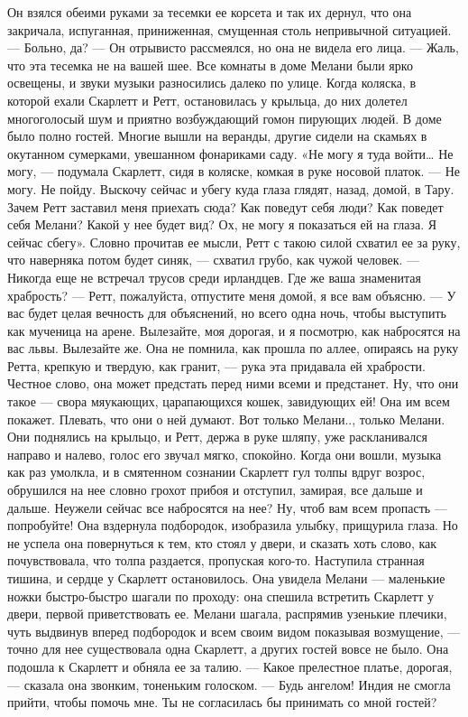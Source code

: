Он взялся обеими руками за тесемки ее корсета и так их дернул, что она закричала, испуганная, приниженная, смущенная столь непривычной ситуацией.
— Больно, да? — Он отрывисто рассмеялся, но она не видела его лица. — Жаль, что эта тесемка не на вашей шее.
Все комнаты в доме Мелани были ярко освещены, и звуки музыки разносились далеко по улице. Когда коляска, в которой ехали Скарлетт и Ретт, остановилась у крыльца, до них долетел многоголосый шум и приятно возбуждающий гомон пирующих людей. В доме было полно гостей. Многие вышли на веранды, другие сидели на скамьях в окутанном сумерками, увешанном фонариками саду.
«Не могу я туда войти… Не могу, — подумала Скарлетт, сидя в коляске, комкая в руке носовой платок. — Не могу. Не пойду.
Выскочу сейчас и убегу куда глаза глядят, назад, домой, в Тару. Зачем Ретт заставил меня приехать сюда? Как поведут себя люди? Как поведет себя Мелани? Какой у нее будет вид? Ох, не могу я показаться ей на глаза. Я сейчас сбегу».
Словно прочитав ее мысли, Ретт с такою силой схватил ее за руку, что наверняка потом будет синяк, — схватил грубо, как чужой человек.
— Никогда еще не встречал трусов среди ирландцев. Где же ваша знаменитая храбрость?
— Ретт, пожалуйста, отпустите меня домой, я все вам объясню.
— У вас будет целая вечность для объяснений, но всего одна ночь, чтобы выступить как мученица на арене. Вылезайте, моя дорогая, и я посмотрю, как набросятся на вас львы. Вылезайте же.
Она не помнила, как прошла по аллее, опираясь на руку Ретта, крепкую и твердую, как гранит, — рука эта придавала ей храбрости. Честное слово, она может предстать перед ними всеми и предстанет. Ну, что они такое — свора мяукающих, царапающихся кошек, завидующих ей! Она им всем покажет. Плевать, что они о ней думают. Вот только Мелани.., только Мелани.
Они поднялись на крыльцо, и Ретт, держа в руке шляпу, уже раскланивался направо и налево, голос его звучал мягко, спокойно. Когда они вошли, музыка как раз умолкла, и в смятенном сознании Скарлетт гул толпы вдруг возрос, обрушился на нее словно грохот прибоя и отступил, замирая, все дальше и дальше. Неужели сейчас все набросятся на нее? Ну, чтоб вам всем пропасть — попробуйте! Она вздернула подбородок, изобразила улыбку, прищурила глаза.
Но не успела она повернуться к тем, кто стоял у двери, и сказать хоть слово, как почувствовала, что толпа раздается, пропуская кого-то. Наступила странная тишина, и сердце у Скарлетт остановилось. Она увидела Мелани — маленькие ножки быстро-быстро шагали по проходу: она спешила встретить Скарлетт у двери, первой приветствовать ее. Мелани шагала, распрямив узенькие плечики, чуть выдвинув вперед подбородок и всем своим видом показывая возмущение, — точно для нее существовала одна Скарлетт, а других гостей вовсе не было. Она подошла к Скарлетт и обняла ее за талию.
— Какое прелестное платье, дорогая, — сказала она звонким, тоненьким голоском. — Будь ангелом! Индия не смогла прийти, чтобы помочь мне. Ты не согласилась бы принимать со мной гостей?


